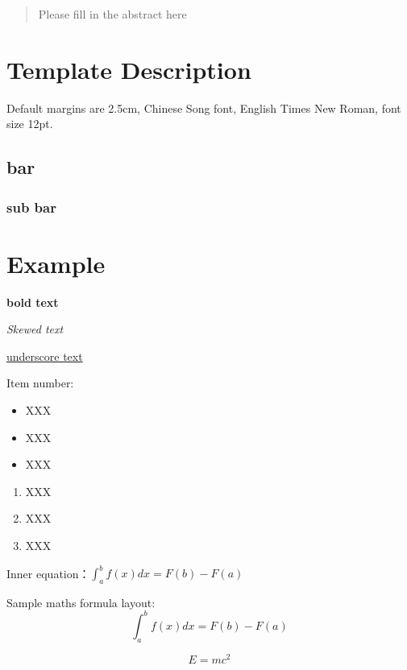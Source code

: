 \documentclass[12pt,hyperref,a4paper,UTF8]{ctexart}
\begin{document}
\cover
\thispagestyle{empty}%
\newpage
\begin{abstract}
    Please fill in the abstract here
\end{abstract}


\newpage
\tableofcontents

\newpage

\section{Template Description}
Default margins are 2.5cm, Chinese Song font, English Times New Roman, font size 12pt.
\subsection{bar}
\subsubsection{sub bar}
\section{Example}
\textbf{bold text}

\textit{Skewed text}

\underline{underscore text}

Item number:

\begin{itemize}
    \item XXX
    \item XXX
    \item XXX
\end{itemize}

\begin{enumerate}
    \item XXX
    \item XXX
    \item XXX
\end{enumerate}

Inner equation：$\int_a^b f(x)dx = F(b)-F(a)$

Sample maths formula layout:
\begin{equation}\label{eq:1}
    \int_a^b f(x)dx = F(b)-F(a)
\end{equation}

\begin{equation}\label{eq:2}
    E = mc^2
\end{equation}
\end{document}
